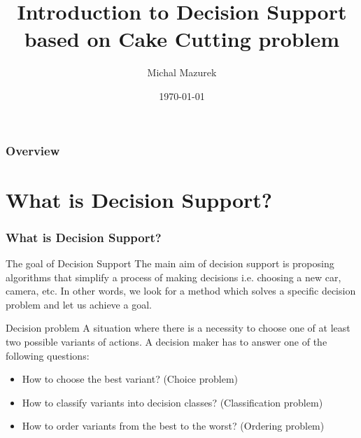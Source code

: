 \documentclass{beamer}
\title[Cake Cutting]{Introduction to Decision Support based on Cake Cutting problem} %
\author{Michal Mazurek} %
\date{\today} %
\begin{document}
\begin{frame}
\titlepage %
\end{frame}

\begin{frame}
\frametitle{Overview} %
\tableofcontents %
\end{frame}



\section{What is Decision Support?}

\begin{frame}
\frametitle{What is Decision Support?}
\begin{block}{The goal of Decision Support}
The main aim of decision support is proposing algorithms that simplify a process of making decisions i.e. choosing a new car, camera, etc. In other words, we look for a method which solves a specific decision problem and let us achieve a goal. 
\end{block}
\begin{block}{Decision problem}
A situation where there is a necessity to choose one of at least two possible variants of actions. A decision maker has to answer one of the following questions:
\begin{itemize}
\item How to choose the best variant? (Choice problem)
\item How to classify variants into decision classes? (Classification problem)
\item How to order variants from the best to the worst? (Ordering problem)
\end{itemize}
\end{block}
\end{frame}
\end{document}
